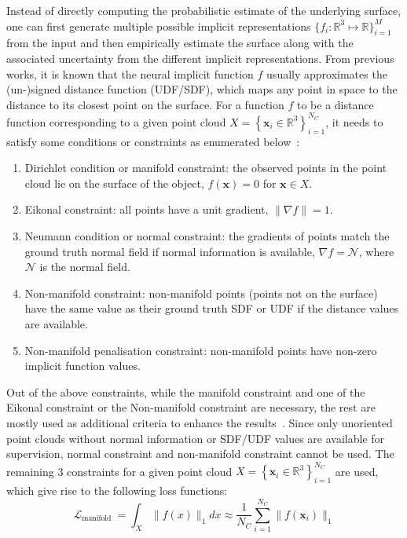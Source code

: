 Instead of directly computing the probabilistic estimate of the underlying surface, one can first generate multiple possible implicit representations $\{f_i: \mathbb{R}^3 \mapsto \mathbb{R}\}_{i=1}^M$ from the input and then empirically estimate the surface along with the associated uncertainty from the different implicit representations. From previous works, it is known that the neural implicit function $f$ usually approximates the (un-)signed distance function (UDF/SDF), which maps any point in space to the distance to its closest point on the surface. For a function $f$ to be a distance function corresponding to a given point cloud $X=\left\{\mathbf{x}_{i} \in \mathbb{R}^{3}\right\}_{i=1}^{N_C}$, it needs to satisfy some conditions or constraints as enumerated below~\cite{DiGS, NeuralHessian}:
\begin{enumerate}
    \item Dirichlet condition or manifold constraint: the observed points in the point cloud lie on the surface of the object, $f(\mathbf{x})=0$ for $\mathbf{x} \in X$.
    \item Eikonal constraint: all points have a unit gradient, $\|\nabla f\|=1$.
    \item Neumann condition or normal constraint:  the gradients of points match the ground truth normal field if normal information is available, $\nabla f=\mathcal{N}$, where $\mathcal{N}$ is the normal field.
    \item Non-manifold constraint: non-manifold points (points not on the surface) have the same value as their ground truth SDF or UDF if the distance values are available.
    \item Non-manifold penalisation constraint: non-manifold points have non-zero implicit function values.
\end{enumerate}
Out of the above constraints, while the manifold constraint and one of the Eikonal constraint or the Non-manifold constraint are necessary, the rest are mostly used as additional criteria to enhance the results~\cite{DiGS}. Since only unoriented point clouds without normal information or SDF/UDF values are available for supervision, normal constraint and non-manifold constraint cannot be used. The remaining 3 constraints for a given point cloud $X=\left\{\mathbf{x}_{i} \in \mathbb{R}^{3}\right\}_{i=1}^{N_C}$ are used, which give rise to the following loss functions:
\begin{equation}\label{manifold_sdf}
    \mathcal{L}_{\text {manifold }}=\int_{X}\|f(x)\|_{1} d x \approx \frac{1}{N_C}\sum_{i=1}^{N_C}\|f(\mathbf{x}_i)\|_1
\end{equation}
